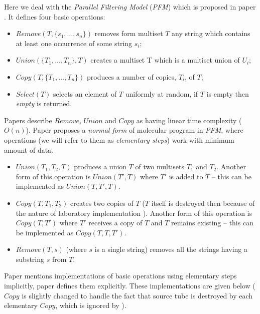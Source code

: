 Here we deal with the \emph{Parallel Filtering Model} (\emph{PFM}) which is proposed in paper \cite{Amos:1996}. It defines four basic operations:
\begin{itemize}
	\item $Remove(T, \{s_1, \dots, s_n\})$ removes form multiset $T$ any string which contains at least one occurrence of some string $s_i$;
	\item $Union(\{T_1, \dots, T_n\}, T)$ creates a multiset T which is a multiset union of $U_i$;
	\item $Copy(T, \{T_1, \dots, T_n\})$ produces a number of copies, $T_i$, of $T$;
	\item $Select(T)$ selects an element of $T$ uniformly at random, if $T$ is empty then \emph{empty} is returned.
\end{itemize}
Papers \cite{Amos:2003:Book, Amos:1997} describe $Remove$, $Union$ and $Copy$ as having linear time complexity ($O(n)$). 
Paper \cite{Katsanyi:2003} proposes a \emph{normal form} of molecular program in \emph{PFM}, where operations (we will refer to them as \emph{elementary steps}) work with minimum amount of data.
\begin{itemize}
	\item $Union(T_1, T_2, T)$ produces a union $T$ of two multisets $T_1$ and $T_2$. Another form of this operation is $Union(T', T)$ where $T'$ is added to $T$ -- this can be implemented as $Union(T, T', T)$.
	\item $Copy(T, T_1, T_2)$ creates two copies of $T$ ($T$ itself is destroyed then because of the nature of laboratory implementation \cite{Amos:1996}). Another form of this operation is $Copy(T, T')$ where $T'$ receives a copy of $T$ and $T$ remains existing -- this can be implemented as $Copy(T, T, T')$.
	\item $Remove(T, s)$ (where $s$ is a single string) removes all the strings having a substring $s$ from $T$.
\end{itemize}

Paper \cite{Amos:1997} mentions implementations of basic operations using elementary steps implicitly, paper \cite{Katsanyi:2003} defines them explicitly. These implementations are given below ($Copy$ is slightly changed to handle the fact that source tube is destroyed by each elementary $Copy$, which is ignored by \cite{Katsanyi:2003}).



